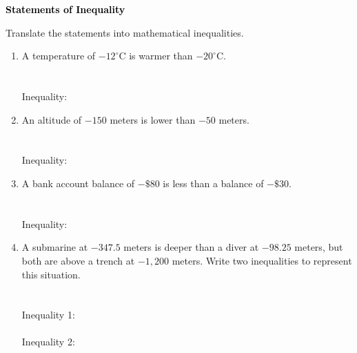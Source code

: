 \documentclass[12pt, letterpaper, fleqn]{article}
\newcommand{\blanklong}{\underline{\hspace{6.5cm}}}
\begin{document}
\newpage

\begin{tcolorbox}[colback=black!10]
\large\textcolor{black}{\textbf{Statements of Inequality}}
\end{tcolorbox}

\noindent
Translate the statements into mathematical inequalities.

\vspace{3mm}

\begin{enumerate}[itemsep=1.5cm, leftmargin=0.6cm]

\item A temperature of $-12^\circ\text{C}$ is warmer than $-20^\circ\text{C}$. \\ \\ \\
Inequality: \blanklong

\vspace{0.8cm}

\item An altitude of $-150$ meters is lower than $-50$ meters. \\ \\ \\
Inequality: \blanklong

\vspace{0.8cm}

\item A bank account balance of $-\$80$ is less than a balance of $-\$30$. \\ \\ \\
Inequality: \blanklong

\vspace{0.8cm}

\item A submarine at $-347.5$ meters is deeper than a diver at $-98.25$ meters, but both are above a trench at $-1{,}200$ meters. Write two inequalities to represent this situation. \\ \\ \\
Inequality 1: \blanklong \\ \\
Inequality 2: \blanklong
\vspace{1cm}

\end{enumerate}
\end{document}
